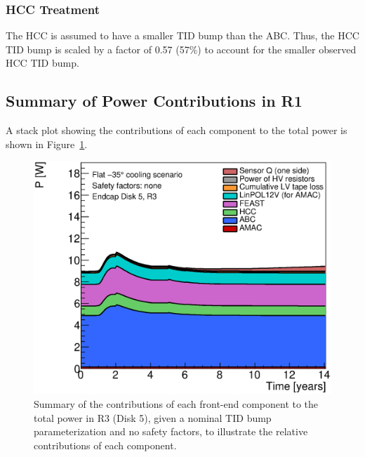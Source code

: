 
\subsubsection*{HCC Treatment}

The HCC is assumed to have a smaller TID bump than the ABC. Thus, the HCC TID bump
is scaled by a factor of 0.57 (57\%) to account for the smaller observed HCC TID bump.

\subsection{Summary of Power Contributions in R1}

A stack plot showing the contributions of each component to the total power is shown in
Figure~\ref{power_stackplot}.

\begin{figure}[ht!]
\begin{center}
\includegraphics[width=0.55\linewidth]{figures/PowerStackPlot.eps}
\end{center}
\caption{Summary of the contributions of each front-end component to the total power in R3 (Disk 5), given
a nominal TID bump parameterization and no safety factors, to illustrate the relative contributions
of each component.}
\label{power_stackplot}
\end{figure}


